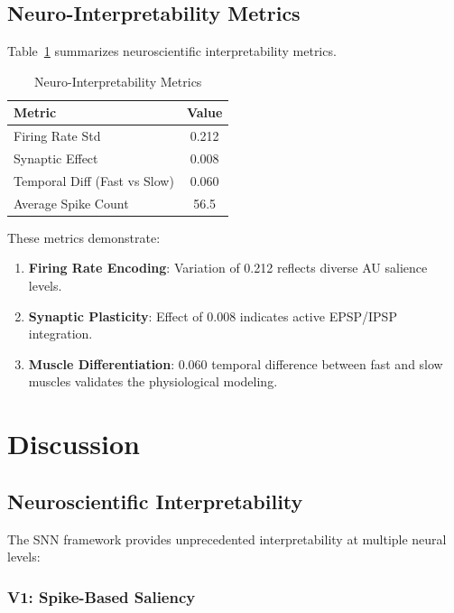\subsection{Neuro-Interpretability Metrics}

Table~\ref{tab:interpretability} summarizes neuroscientific interpretability metrics.

\begin{table}[htbp]
\centering
\caption{Neuro-Interpretability Metrics}
\label{tab:interpretability}
\begin{tabular}{lc}
\toprule
Metric & Value \\
\midrule
Firing Rate Std & 0.212 \\
Synaptic Effect & 0.008 \\
Temporal Diff (Fast vs Slow) & 0.060 \\
Average Spike Count & 56.5 \\
\bottomrule
\end{tabular}
\end{table}

These metrics demonstrate:
\begin{enumerate}
\item \textbf{Firing Rate Encoding}: Variation of 0.212 reflects diverse AU salience levels.
\item \textbf{Synaptic Plasticity}: Effect of 0.008 indicates active EPSP/IPSP integration.
\item \textbf{Muscle Differentiation}: 0.060 temporal difference between fast and slow muscles validates the physiological modeling.
\end{enumerate}

\section{Discussion}
\label{sec:discussion}

\subsection{Neuroscientific Interpretability}

The SNN framework provides unprecedented interpretability at multiple neural levels:

\subsubsection{V1: Spike-Based Saliency}

